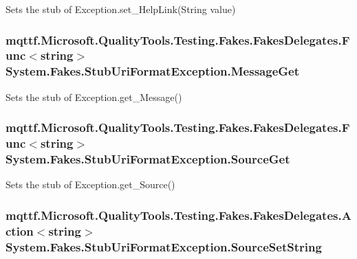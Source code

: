 Sets the stub of Exception.\-set\-\_\-\-Help\-Link(\-String value)

\hypertarget{class_system_1_1_fakes_1_1_stub_uri_format_exception_a7f10be8e7c3b1268957bf2e13bae3050}{
\subsubsection[{Message\-Get}]{\setlength{\rightskip}{0pt plus 5cm}mqttf.\-Microsoft.\-Quality\-Tools.\-Testing.\-Fakes.\-Fakes\-Delegates.\-Func$<$string$>$ System.\-Fakes.\-Stub\-Uri\-Format\-Exception.\-Message\-Get}}\label{class_system_1_1_fakes_1_1_stub_uri_format_exception_a7f10be8e7c3b1268957bf2e13bae3050}


Sets the stub of Exception.\-get\-\_\-\-Message()

\hypertarget{class_system_1_1_fakes_1_1_stub_uri_format_exception_a99621be4936c679fbc01ecf3c1f0acb8}{
\subsubsection[{Source\-Get}]{\setlength{\rightskip}{0pt plus 5cm}mqttf.\-Microsoft.\-Quality\-Tools.\-Testing.\-Fakes.\-Fakes\-Delegates.\-Func$<$string$>$ System.\-Fakes.\-Stub\-Uri\-Format\-Exception.\-Source\-Get}}\label{class_system_1_1_fakes_1_1_stub_uri_format_exception_a99621be4936c679fbc01ecf3c1f0acb8}


Sets the stub of Exception.\-get\-\_\-\-Source()

\hypertarget{class_system_1_1_fakes_1_1_stub_uri_format_exception_a1810be7351cfca985240aab4aa16cb58}{
\subsubsection[{Source\-Set\-String}]{\setlength{\rightskip}{0pt plus 5cm}mqttf.\-Microsoft.\-Quality\-Tools.\-Testing.\-Fakes.\-Fakes\-Delegates.\-Action$<$string$>$ System.\-Fakes.\-Stub\-Uri\-Format\-Exception.\-Source\-Set\-String}}\label{class_system_1_1_fakes_1_1_stub_uri_format_exception_a1810be7351cfca985240aab4aa16cb58}


